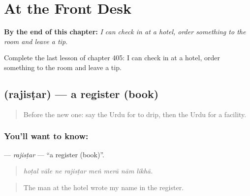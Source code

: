 
\chapter{At the Front Desk}
\label{ch:ur-at-the-front-desk}

\begin{chapteropening}
\textbf{By the end of this chapter:} \emph{I can check in at a hotel, order something to the room and leave a tip.}

Complete the last lesson of chapter 405: I can check in at a hotel, order something to the room and leave a tip.
\end{chapteropening}

\section[\texorpdfstring{\ur{رجسٹر} (rajisṭar)}{رجسٹر (rajisṭar)}]{ (rajisṭar) — a register (book)}

\label{lesson:UR-C405-rajistar}



\begin{quote}
Before the new one: say the Urdu for to drip, then the Urdu for a facility.
\end{quote}

\subsection*{You'll want to know: }
\textbf{} — \emph{rajisṭar} — \textquotedblleft{}a register (book)\textquotedblright{}.

\begin{quote}
       
\end{quote}

\begin{quote}
\emph{hoṭal vāle ne rajisṭar meṅ merā nām likhā.}
\end{quote}

\begin{quote}
The man at the hotel wrote my name in the register.
\end{quote}

